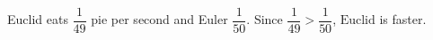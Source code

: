 Euclid eats $\dfrac{1}{49}$ pie per second and Euler $\dfrac{1}{50}$. Since $\dfrac{1}{49}>\dfrac{1}{50}$, $\boxed{\text{Euclid}}$ is faster.

